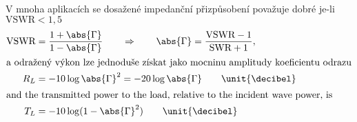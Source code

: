      V mnoha aplikacích se dosažené impedanční přizpůsobení považuje dobré je-li \(\text{VSWR}<1,5\)
     \begin{align}
       \text{VSWR} &= \frac{1+\abs{\Gamma}}{1-\abs{\Gamma}} \qquad \Rightarrow \qquad
                     \abs{\Gamma} = \frac{\text{VSWR}-1}{\text{SWR}+1}, \\
       \shortintertext{a odražený výkon lze jednoduše získat jako mocninu amplitudy koeficientu 
         odrazu} 
       R_L &= -10\log\abs{\Gamma}^2 = -20\log\abs{\Gamma} \qquad\unit{\decibel} \\
       \shortintertext{and the transmitted power to the load, relative to the incident wave power, 
         is}
       T_L &= -10\log(1 - \abs{\Gamma}^2) \qquad\unit{\decibel}
     \end{align}
     
